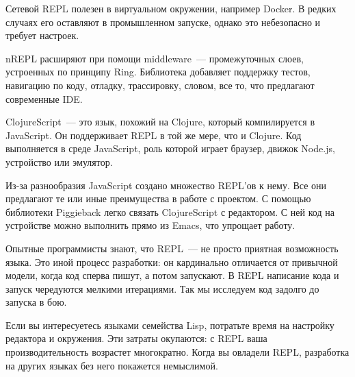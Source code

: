 Сетевой REPL полезен в виртуальном окружении, например Docker. В редких случаях его оставляют в промышленном запуске, однако это небезопасно и требует настроек.

nREPL расширяют при помощи middleware~--- промежуточных слоев, устроенных по принципу Ring. Библиотека  добавляет поддержку тестов, навигацию по коду, отладку, трассировку, словом, все то, что предлагают современные IDE.

ClojureScript~--- это язык, похожий на Clojure, который компилируется в JavaScript. Он поддерживает REPL в той же мере, что и Clojure. Код выполняется в среде JavaScript, роль которой играет браузер, движок Node.js, устройство или эмулятор.

Из-за разнообразия JavaScript создано множество REPL'ов к нему. Все они предлагают те или иные преимущества в работе с проектом. С помощью библиотеки Piggieback легко связать ClojureScript с редактором. С ней код на устройстве можно выполнить прямо из Emacs, что упрощает работу.

\begin{framed}

Опытные программисты знают, что REPL~--- не просто приятная возможность языка. Это иной процесс разработки: он кардинально отличается от привычной модели, когда код сперва пишут, а потом запускают. В REPL написание кода и запуск чередуются мелкими итерациями. Так мы исследуем код задолго до запуска в бою.

Если вы интересуетесь языками семейства Lisp, потратьте время на настройку редактора и окружения. Эти затраты окупаются: с REPL ваша производительность возрастет многократно. Когда вы овладели REPL, разработка на других языках без него покажется немыслимой.

\end{framed}
